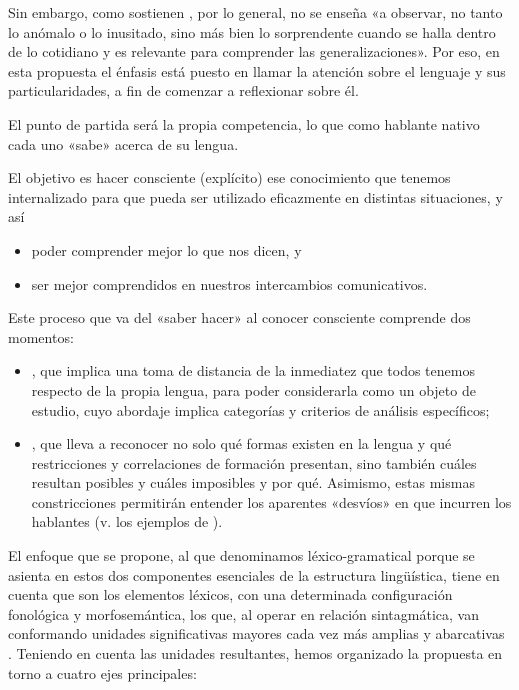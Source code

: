Sin embargo, como sostienen \textcite[69]{bosque2016}, por lo general, no se
enseña «a observar, no tanto lo anómalo o lo inusitado, sino más bien lo
sorprendente cuando se halla dentro de lo cotidiano y es relevante para
comprender las generalizaciones». Por eso, en esta propuesta el énfasis está
puesto en llamar la atención sobre el lenguaje y sus particularidades, a fin de
comenzar a reflexionar sobre él.

El punto de partida será la propia competencia, lo que como hablante nativo
cada uno «sabe» acerca de su lengua.

El objetivo es hacer consciente (explícito) ese conocimiento que tenemos
internalizado para que pueda ser utilizado eficazmente en distintas
situaciones, y así

\begin{itemize}[label=$\rightarrow$]
  \item poder comprender mejor lo que nos dicen, y
  \item ser mejor comprendidos en nuestros intercambios comunicativos.
\end{itemize}

Este proceso que va del «saber hacer» al conocer consciente comprende dos
momentos:

\begin{itemize}
  \item {}, que implica una toma de distancia de la
        inmediatez que todos tenemos respecto de la propia lengua, para poder
        considerarla como un objeto de estudio, cuyo abordaje implica
        categorías y criterios de análisis específicos;
  \item {}, que lleva a reconocer no solo qué
        formas existen en la lengua y qué restricciones y correlaciones de
        formación presentan, sino también cuáles resultan posibles y cuáles
        imposibles y por qué. Asimismo, estas mismas constricciones permitirán
        entender los aparentes «desvíos» en que incurren los hablantes (v. los
        ejemplos de ).
\end{itemize}

El enfoque que se propone, al que denominamos léxico-gramatical porque se
asienta en estos dos componentes esenciales de la estructura lingüística, tiene
en cuenta que son los elementos léxicos, con una determinada configuración
fonológica y morfosemántica, los que, al operar en relación sintagmática, van
conformando unidades significativas mayores cada vez más amplias y abarcativas
\parencite{giammatteo2017}. Teniendo en cuenta las unidades resultantes, hemos
organizado la propuesta en torno a cuatro ejes principales:

